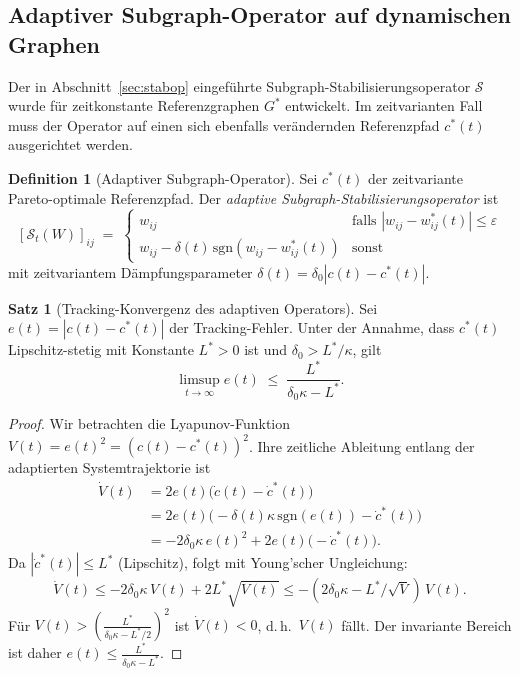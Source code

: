 \documentclass[a4paper, 12pt, twoside, openright]{report}
\theoremstyle{definition}
\newtheorem{definition}[theorem]{Definition}
\theoremstyle{definition}
\newtheorem{satz}{Satz}[chapter]
\begin{document}
\subsection{Adaptiver Subgraph-Operator auf dynamischen Graphen}

Der in Abschnitt~\ref{sec:stabop} eingeführte Subgraph-Stabilisierungsoperator
$\mathcal{S}$ wurde für zeitkonstante Referenzgraphen $G^*$ entwickelt. Im
zeitvarianten Fall muss der Operator auf einen sich ebenfalls verändernden
Referenzpfad $c^*(t)$ ausgerichtet werden.

\begin{definition}[Adaptiver Subgraph-Operator]
\label{def:adaptiveOp}
    Sei $c^*(t)$ der zeitvariante Pareto-optimale Referenzpfad. Der
    \emph{adaptive Subgraph-Stabilisierungsoperator} ist
    \[
        [\mathcal{S}_t(W)]_{ij} \;=\;
        \begin{cases}
            w_{ij} & \text{falls } |w_{ij} - w^*_{ij}(t)| \leq \varepsilon \\
            w_{ij} - \delta(t)\,\mathrm{sgn}(w_{ij} - w^*_{ij}(t)) & \text{sonst}
        \end{cases}
    \]
    mit zeitvariantem Dämpfungsparameter $\delta(t) = \delta_0 |c(t) - c^*(t)|$.
\end{definition}

\begin{satz}[Tracking-Konvergenz des adaptiven Operators]
\label{satz:tracking}
    Sei $e(t) = |c(t) - c^*(t)|$ der Tracking-Fehler. Unter der Annahme, dass
    $c^*(t)$ Lipschitz-stetig mit Konstante $L^* > 0$ ist und
    $\delta_0 > L^*/\kappa$, gilt
    \[
        \limsup_{t\to\infty} e(t) \;\leq\; \frac{L^*}{\delta_0 \kappa - L^*}.
    \]
\end{satz}

\begin{proof}
    Wir betrachten die Lyapunov-Funktion $V(t) = e(t)^2 = (c(t) - c^*(t))^2$.
    Ihre zeitliche Ableitung entlang der adaptierten Systemtrajektorie ist
    \begin{align*}
        \dot{V}(t) &= 2e(t)\bigl(\dot{c}(t) - \dot{c}^*(t)\bigr) \\
                   &= 2e(t)\bigl(-\delta(t)\kappa\,\mathrm{sgn}(e(t)) - \dot{c}^*(t)\bigr) \\
                   &= -2\delta_0\kappa\,e(t)^2 + 2e(t)\bigl(-\dot{c}^*(t)\bigr).
    \end{align*}
    Da $|\dot{c}^*(t)| \leq L^*$ (Lipschitz), folgt mit Young'scher Ungleichung:
    \[
        \dot{V}(t) \leq -2\delta_0\kappa\,V(t) + 2L^*\sqrt{V(t)}
        \leq -(2\delta_0\kappa - L^*/\sqrt{V})\,V(t).
    \]
    Für $V(t) > \left(\frac{L^*}{\delta_0\kappa - L^*/2}\right)^2$ ist
    $\dot{V}(t) < 0$, d.\,h.\ $V(t)$ fällt. Der invariante Bereich ist
    daher $e(t) \leq \frac{L^*}{\delta_0\kappa - L^*}$.
\end{proof}
\end{document}
